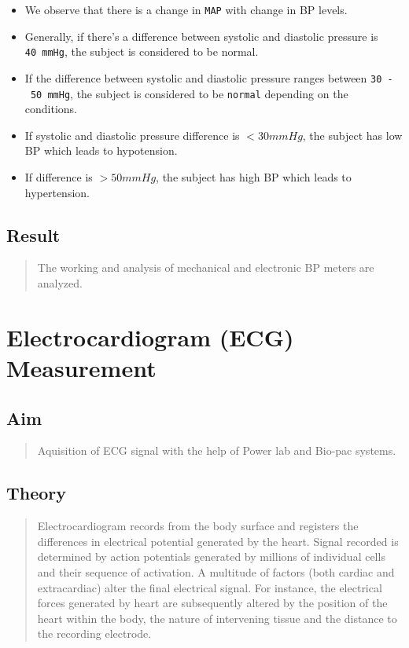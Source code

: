\documentclass[
  11pt,
  letterpaper,
  DIV=11,
  numbers=noendperiod]{scrreprt}
\begin{document}
\begin{itemize}
\item
  We observe that there is a change in \texttt{MAP} with change in BP
  levels.
\item
  Generally, if there's a difference between systolic and diastolic
  pressure is \texttt{40\ mmHg}, the subject is considered to be normal.
\item
  If the difference between systolic and diastolic pressure ranges
  between \texttt{30\ -\ 50\ mmHg}, the subject is considered to be
  \texttt{normal} depending on the conditions.
\item
  If systolic and diastolic pressure difference is \(<30mmHg\), the
  subject has low BP which leads to hypotension.
\item
  If difference is \(>50mmHg\), the subject has high BP which leads to
  hypertension.
\end{itemize}

\section{Result}\label{result}

\begin{quote}
The working and analysis of mechanical and electronic BP meters are
analyzed.
\end{quote}


\chapter{Electrocardiogram (ECG)
Measurement}\label{electrocardiogram-ecg-measurement}

\section{Aim}\label{aim-1}

\begin{quote}
Aquisition of ECG signal with the help of Power lab and Bio-pac systems.
\end{quote}

\section{Theory}\label{theory-1}

\begin{quote}
Electrocardiogram records from the body surface and registers the
differences in electrical potential generated by the heart. Signal
recorded is determined by action potentials generated by millions of
individual cells and their sequence of activation. A multitude of
factors (both cardiac and extracardiac) alter the final electrical
signal. For instance, the electrical forces generated by heart are
subsequently altered by the position of the heart within the body, the
nature of intervening tissue and the distance to the recording
electrode.
\end{quote}
\end{document}

